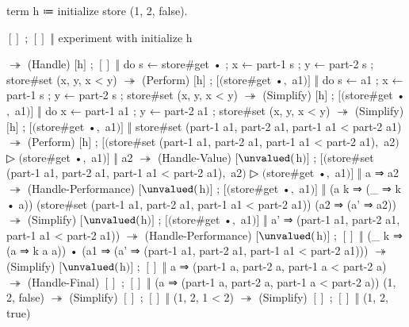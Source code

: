 \begin{snippet}
term h ≔ initialize store (1, 2, false).

$[]$ ; $[]$ ‖ experiment with initialize h

$↠$ (Handle)
$[$h$]$ ; $[]$
  ‖ do{ s ← store#get •
      ; x ← part-1 s
      ; y ← part-2 s
      ; store#set (x, y, x < y) }
$↠$ (Perform)
$[$h$]$ ; $[$$($store#get •$,$ a1$)$$]$
  ‖ do{ s ← a1
      ; x ← part-1 s
      ; y ← part-2 s
      ; store#set (x, y, x < y) }
$↠$ (Simplify)
$[$h$]$ ; $[$$($store#get •$,$ a1$)$$]$
  ‖ do{ x ← part-1 a1
      ; y ← part-2 a1
      ; store#set (x, y, x < y) }
$↠$ (Simplify)
$[$h$]$ ; $[$$($store#get •$,$ a1$)$$]$
  ‖ store#set (part-1 a1, part-2 a1, part-1 a1 < part-2 a1)
$↠$ (Perform)
$[$h$]$
; $[$$($store#set (part-1 a1, part-2 a1, part-1 a1 < part-2 a1)$,$ a2$)$
$ $▷ $($store#get •$,$ a1$)$$]$
  ‖ a2
$↠$ (Handle-Value)
$[$$\unvalued($h$)$$]$
; $[$$($store#set (part-1 a1, part-2 a1, part-1 a1 < part-2 a1)$,$ a2$)$
$ $▷ $($store#get •$,$ a1$)$$]$
  ‖ a ⇒ a2
$↠$ (Handle-Performance)
$[$$\unvalued($h$)$$]$ ; $[$$($store#get •$,$ a1$)$$]$
  ‖ (a k ⇒ (_ ⇒ k • a))
      (store#set (part-1 a1, part-2 a1, part-1 a1 < part-2 a1))
      (a2 ⇒ (a' ⇒ a2))
$↠$ (Simplify)
$[$$\unvalued($h$)$$]$ ; $[$$($store#get •$,$ a1$)$$]$
  ‖ a' ⇒ (part-1 a1, part-2 a1, part-1 a1 < part-2 a1))
$↠$ (Handle-Performance)
$[$$\unvalued($h$)$$]$ ; $[]$
  ‖ (_ k ⇒ (a ⇒ k a a))
      •
      (a1 ⇒ (a' ⇒ (part-1 a1, part-2 a1, part-1 a1 < part-2 a1)))
$↠$ (Simplify)
$[$$\unvalued($h$)$$]$ ; $[]$ ‖ a ⇒ (part-1 a, part-2 a, part-1 a < part-2 a)
$↠$ (Handle-Final)
$[]$ ; $[]$ ‖ (a ⇒ (part-1 a, part-2 a, part-1 a < part-2 a)) (1, 2, false)
$↠$ (Simplify)
$[]$ ; $[]$ ‖ (1, 2, 1 < 2)
$↠$ (Simplify)
$[]$ ; $[]$ ‖ (1, 2, true)
\end{snippet}
